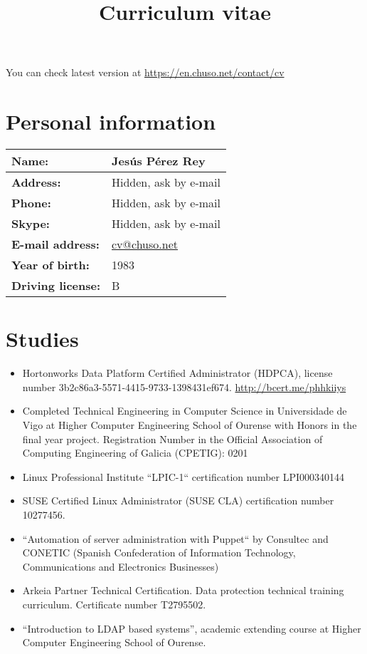 \documentclass[english]{simplecv}
\providecommand{\tabularnewline}{\\}
\begin{document}
\title{Curriculum vitae}

\maketitle
\noindent \begin{center}
{\scriptsize You can check latest version at \url{https://en.chuso.net/contact/cv}}
\end{center}{\scriptsize}

\section{Personal information}

\begin{tabular}{ll}
\toprule 
\textbf{Name:} & Jesús Pérez Rey\tabularnewline
\midrule 
\textbf{Address:} & Hidden, ask by e-mail\tabularnewline
\midrule 
\textbf{Phone:} & Hidden, ask by e-mail\tabularnewline
\midrule 
\textbf{Skype:} & Hidden, ask by e-mail\tabularnewline
\midrule 
\textbf{E-mail address:} & \href{mailto:cv@chuso.net}{cv@chuso.net}\tabularnewline
\midrule 
\textbf{Year of birth:} & 1983\tabularnewline
\midrule
\textbf{Driving license:} & B\tabularnewline
\bottomrule 
\end{tabular}

\section{Studies}

\begin{itemize}
\item Hortonworks Data Platform Certified Administrator (HDPCA), license number 3b2c86a3-5571-4415-9733-1398431ef674.\newline
\url{http://bcert.me/phhkiiys}
\item Completed Technical Engineering in Computer Science in Universidade de Vigo at Higher Computer Engineering School of Ourense with Honors in the final year project.\newline
Registration Number in the Official Association of Computing Engineering of Galicia (CPETIG): 0201
\item Linux Professional Institute ``LPIC-1`` certification number LPI000340144
\item SUSE Certified Linux Administrator (SUSE CLA) certification number 10277456.
\item ``Automation of server administration with Puppet`` by Consultec and CONETIC
(Spanish Confederation of Information Technology, Communications and Electronics Businesses)
\item Arkeia Partner Technical Certification. Data protection technical training curriculum. Certificate number T2795502.
\item {}``Introduction to LDAP based systems'', academic extending course at Higher Computer Engineering School of Ourense.
\end{itemize}
\end{document}
